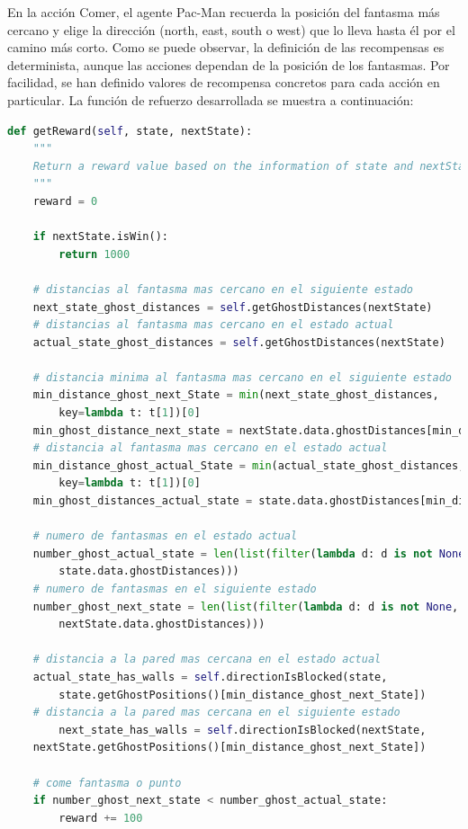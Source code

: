 \documentclass[11pt]{exam}
\begin{document}
En la acción Comer, el agente Pac-Man recuerda la posición del fantasma más cercano y elige la dirección (north, east, south o west) que lo lleva hasta él por el camino más corto. Como se puede observar, la definición de las recompensas es determinista, aunque las acciones dependan de la posición de los fantasmas. Por facilidad, se han definido valores de recompensa concretos para cada acción en particular. La función de refuerzo desarrollada se muestra a continuación:

\begin{lstlisting}[caption={Función de refuerzo.}, label={reward}, language=python, basicstyle=\footnotesize]
def getReward(self, state, nextState):
	"""
	Return a reward value based on the information of state and nextState
	"""
	reward = 0
	
	if nextState.isWin():
		return 1000
	
	# distancias al fantasma mas cercano en el siguiente estado
	next_state_ghost_distances = self.getGhostDistances(nextState)
	# distancias al fantasma mas cercano en el estado actual
	actual_state_ghost_distances = self.getGhostDistances(nextState)
	
	# distancia minima al fantasma mas cercano en el siguiente estado
	min_distance_ghost_next_State = min(next_state_ghost_distances, 
		key=lambda t: t[1])[0]
	min_ghost_distance_next_state = nextState.data.ghostDistances[min_distance_ghost_next_State]
	# distancia al fantasma mas cercano en el estado actual
	min_distance_ghost_actual_State = min(actual_state_ghost_distances, 
		key=lambda t: t[1])[0]
	min_ghost_distances_actual_state = state.data.ghostDistances[min_distance_ghost_actual_State]
	
	# numero de fantasmas en el estado actual
	number_ghost_actual_state = len(list(filter(lambda d: d is not None, 
		state.data.ghostDistances)))
	# numero de fantasmas en el siguiente estado
	number_ghost_next_state = len(list(filter(lambda d: d is not None, 
		nextState.data.ghostDistances)))
	
	# distancia a la pared mas cercana en el estado actual
	actual_state_has_walls = self.directionIsBlocked(state,
		state.getGhostPositions()[min_distance_ghost_next_State])
	# distancia a la pared mas cercana en el siguiente estado
		next_state_has_walls = self.directionIsBlocked(nextState,
	nextState.getGhostPositions()[min_distance_ghost_next_State])
	
	# come fantasma o punto
	if number_ghost_next_state < number_ghost_actual_state:
		reward += 100
	

\end{lstlisting}
\end{document}

